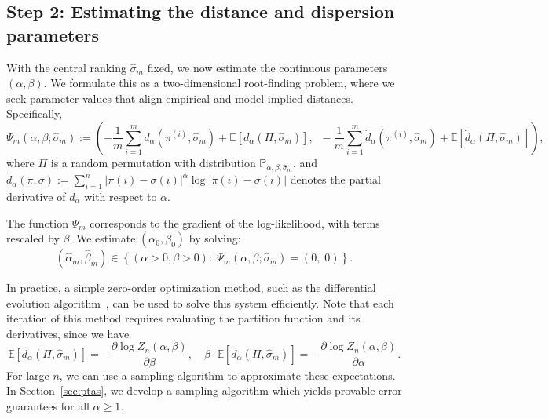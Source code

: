 \documentclass{article}
\renewcommand{\P}{\mathbb{P}}
\begin{document}
\subsection{Step 2: Estimating the distance and dispersion parameters}

With the central ranking \(\hat\sigma_m\) fixed, we now estimate the continuous parameters \((\alpha, \beta)\). We formulate this as a two-dimensional root-finding problem, where we seek parameter values that align empirical and model-implied distances.
Specifically,
\[
\Psi_m(\alpha, \beta; \hat\sigma_m) := \left(
-\frac{1}{m} \sum_{i=1}^m d_\alpha(\pi^{(i)}, \hat\sigma_m) + \mathbb{E}[d_\alpha(\Pi, \hat\sigma_m)], \;\;
-\frac{1}{m} \sum_{i=1}^m \dot{d}_\alpha(\pi^{(i)}, \hat\sigma_m) + \mathbb{E}[\dot{d}_\alpha(\Pi, \hat\sigma_m)]
\right),
\]
where $\Pi$ is a random permutation with distribution $\P_{\alpha,\beta,\hat\sigma_m}$, and
$\dot{d}_\alpha(\pi, \sigma) := \sum_{i=1}^n |\pi(i) - \sigma(i)|^\alpha \log |\pi(i) - \sigma(i)|$
denotes the partial derivative of \(d_\alpha\) with respect to \(\alpha\).

The function \(\Psi_m\) corresponds to the gradient of the log-likelihood, with terms rescaled by \(\beta\). We estimate \((\alpha_0, \beta_0)\) by solving:
\[
(\hat\alpha_m, \hat\beta_m) \in \left\{ (\alpha > 0, \beta > 0) :\; \Psi_m(\alpha, \beta; \hat\sigma_m) = (0,\; 0) \right\}.
\]


In practice, a simple zero-order optimization method, such as the differential evolution algorithm~\cite{storn1997differential}, can be used to solve this system efficiently. Note that each iteration of this method requires evaluating the partition function and its derivatives, since we have
\[
\mathbb{E}[d_\alpha(\Pi, \hat\sigma_m)] = -\frac{\partial \log Z_n(\alpha,\beta)}{\partial \beta}, \quad
\beta \cdot \mathbb{E}[\dot{d}_\alpha(\Pi, \hat\sigma_m)] = -\frac{\partial \log Z_n(\alpha,\beta)}{\partial \alpha}.
\]
For large \(n\), we can use a sampling algorithm to approximate these expectations. In Section~\ref{sec:ptas}, we develop a sampling algorithm which yields provable error guarantees for all \(\alpha \geq 1\). 
\end{document}
